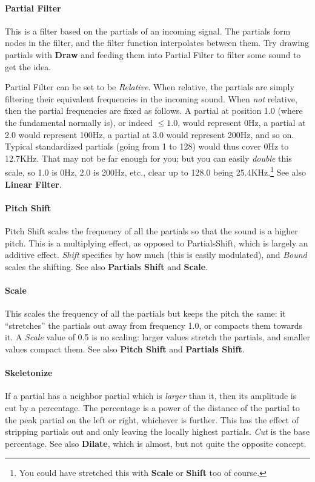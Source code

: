 \documentclass{article}
\begin{document}
\paragraph{Partial Filter} This is a filter based on the partials of an incoming signal.  The partials form nodes in the filter, and the filter function interpolates between them.  Try drawing partials with {\bf Draw} and feeding them into Partial Filter to filter some sound to get the idea.  

Partial Filter can be set to be {\it Relative}.  When relative, the partials are simply filtering their equivalent frequencies in the incoming sound.  When {\it not} relative, then the partial frequencies are fixed as follows.  A partial at position 1.0 (where the fundamental normally is), or indeed \(\leq 1.0\), would represent 0Hz, a partial at 2.0 would represent 100Hz, a partial at 3.0 would represent 200Hz, and so on.  Typical standardized partials (going from 1 to 128) would thus cover 0Hz to 12.7KHz.  That may not be far enough for you; but you can easily {\it double} this scale, so 1.0 is 0Hz, 2.0 is 200Hz, etc., clear up to 128.0 being 25.4KHz.\footnote{You could have stretched this with {\bf Scale} or {\bf Shift} too of course.}  See also {\bf Linear Filter}.

\paragraph{Pitch Shift} Pitch Shift scales the frequency of all the partials so that the sound is a higher pitch.  This is a multiplying effect, as opposed to PartialsShift, which is largely an additive effect.    {\it Shift} specifies by how much (this is easily modulated), and {\it Bound} scales the shifting.  See also {\bf Partials Shift} and  {\bf Scale}.

\paragraph{Scale} This scales the frequency of all the partials but keeps the pitch the same: it ``stretches'' the partials out away from frequency 1.0, or compacts them towards it.  A {\it Scale} value of 0.5 is no scaling: larger values stretch the partials, and smaller values compact them.   See also  {\bf Pitch Shift} and  {\bf Partials Shift}.

\paragraph{Skeletonize} If a partial has a neighbor partial which is {\it larger} than it, then its amplitude is cut by a percentage.  The percentage is a power of the distance of the partial to the peak partial on the left or right, whichever is further.  This has the effect of stripping partials out and only leaving the locally highest partials.  {\it Cut} is the base percentage.  See also {\bf Dilate}, which is almost, but not quite the opposite concept.
\end{document}
